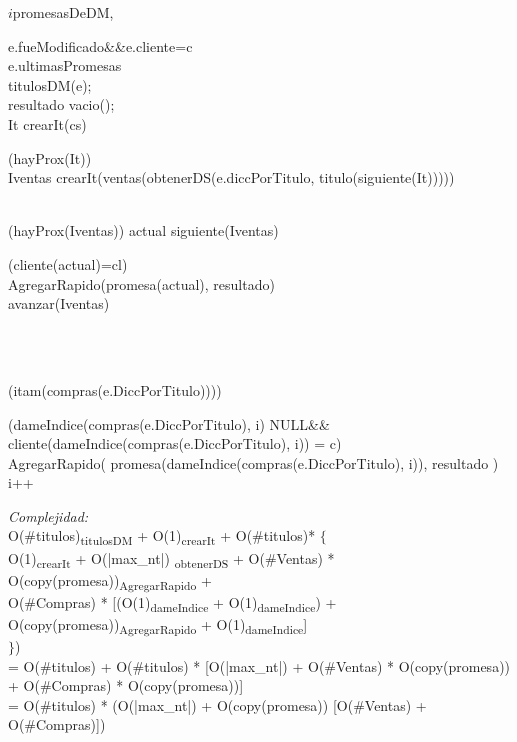 			
 \begin{algorithm}{$i$promesasDeDM}{, }{}
 	\begin{IF}{\neg e.fueModificado$ $\&\&$ $e.cliente=c} \\
 		\RETURN e.ultimasPromesas 
 	\ELSE \\
 		 \leftarrow titulosDM(e); \\
 		resultado \leftarrow vacio(); \\
 		It \leftarrow crearIt(cs) \\
 		\begin{WHILE}{(hayProx(It))} 
 			 \\
 			Iventas \leftarrow crearIt(ventas(obtenerDS(e.diccPorTitulo, titulo(siguiente(It))))) \\
 			 \\
 			\begin{WHILE}{(hayProx(Iventas))} 
 				actual \leftarrow siguiente(Iventas) \\
 				\begin{IF}{(cliente(actual)=cl)} \\
 					AgregarRapido(promesa(actual), resultado) 
 				\ELSE \\
 					avanzar(Iventas) 
 				\end{IF} 
 			\end{WHILE}\\
 			  \\
 			\begin{WHILE}{(i\leq tam(compras(e.DiccPorTitulo))))} 
 				\begin{IF}{(dameIndice(compras(e.DiccPorTitulo), i) \neq NULL$ $\&\& \\ cliente(dameIndice(compras(e.DiccPorTitulo), i)) = c)} \\
 					AgregarRapido(
 					promesa(dameIndice(compras(e.DiccPorTitulo), i)),
 					resultado
 					)
 				\ELSE \\
 					i++ 
 				\end{IF} 
 			\end{WHILE}
 		\end{WHILE}
 	\end{IF} 
 \end{algorithm}	
 		\textit{Complejidad:}  \\
 		O(\#titulos)\textsubscript{titulosDM} + O(1)\textsubscript{crearIt} + O(\#titulos)* $\lbrace$ \\
 		O(1)\textsubscript{crearIt} + O(|max\_nt|) \textsubscript{obtenerDS} +  O(\#Ventas) * 
 		O(copy(promesa))\textsubscript{AgregarRapido} + \\
 		O(\#Compras) * [(O(1)\textsubscript{dameIndice} + O(1)\textsubscript{dameIndice}) +
 		O(copy(promesa))\textsubscript{AgregarRapido} + O(1)\textsubscript{dameIndice}]\\
 		$\rbrace$) \\
		= O(\#titulos) + O(\#titulos) * [O(|max\_nt|) + O(\#Ventas) *  O(copy(promesa)) + O(\#Compras) * 
 		O(copy(promesa))] \\
		= O(\#titulos) *  (O(|max\_nt|) +  O(copy(promesa)) [O(\#Ventas) + O(\#Compras)])

